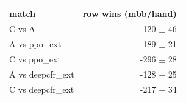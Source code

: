 \begin{tabular}{lr}
\toprule
match & row wins (mbb/hand) \\
\midrule
C vs A & -120 $\pm$ 46 \\
A vs ppo\_ext & -189 $\pm$ 21 \\
C vs ppo\_ext & -296 $\pm$ 28 \\
A vs deepcfr\_ext & -128 $\pm$ 25 \\
C vs deepcfr\_ext & -217 $\pm$ 34 \\
\bottomrule
\end{tabular}

